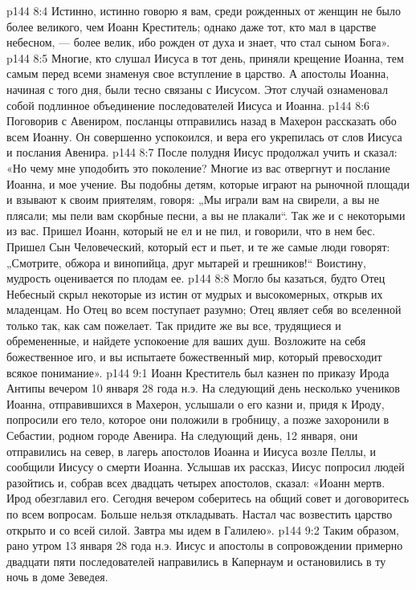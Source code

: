 \vs p144 8:4 Истинно, истинно говорю я вам, среди рожденных от женщин не было более великого, чем Иоанн Креститель; однако даже тот, кто мал в царстве небесном, --- более велик, ибо рожден от духа и знает, что стал сыном Бога».
\vs p144 8:5 Многие, кто слушал Иисуса в тот день, приняли крещение Иоанна, тем самым перед всеми знаменуя свое вступление в царство. А апостолы Иоанна, начиная с того дня, были тесно связаны с Иисусом. Этот случай ознаменовал собой подлинное объединение последователей Иисуса и Иоанна.
\vs p144 8:6 Поговорив с Авениром, посланцы отправились назад в Махерон рассказать обо всем Иоанну. Он совершенно успокоился, и вера его укрепилась от слов Иисуса и послания Авенира.
\vs p144 8:7 После полудня Иисус продолжал учить и сказал: «Но чему мне уподобить это поколение? Многие из вас отвергнут и послание Иоанна, и мое учение. Вы подобны детям, которые играют на рыночной площади и взывают к своим приятелям, говоря: „Мы играли вам на свирели, а вы не плясали; мы пели вам скорбные песни, а вы не плакали“. Так же и с некоторыми из вас. Пришел Иоанн, который не ел и не пил, и говорили, что в нем бес. Пришел Сын Человеческий, который ест и пьет, и те же самые люди говорят: „Смотрите, обжора и винопийца, друг мытарей и грешников!“ Воистину, мудрость оценивается по плодам ее.
\vs p144 8:8 Могло бы казаться, будто Отец Небесный скрыл некоторые из истин от мудрых и высокомерных, открыв их младенцам. Но Отец во всем поступает разумно; Отец являет себя во вселенной только так, как сам пожелает. Так придите же вы все, трудящиеся и обремененные, и найдете успокоение для ваших душ. Возложите на себя божественное иго, и вы испытаете божественный мир, который превосходит всякое понимание».
\vs p144 9:1 Иоанн Креститель был казнен по приказу Ирода Антипы вечером 10 января 28 года н.э. На следующий день несколько учеников Иоанна, отправившихся в Махерон, услышали о его казни и, придя к Ироду, попросили его тело, которое они положили в гробницу, а позже захоронили в Себастии, родном городе Авенира. На следующий день, 12 января, они отправились на север, в лагерь апостолов Иоанна и Иисуса возле Пеллы, и сообщили Иисусу о смерти Иоанна. Услышав их рассказ, Иисус попросил людей разойтись и, собрав всех двадцать четырех апостолов, сказал: «Иоанн мертв. Ирод обезглавил его. Сегодня вечером соберитесь на общий совет и договоритесь по всем вопросам. Больше нельзя откладывать. Настал час возвестить царство открыто и со всей силой. Завтра мы идем в Галилею».
\vs p144 9:2 Таким образом, рано утром 13 января 28 года н.э. Иисус и апостолы в сопровождении примерно двадцати пяти последователей направились в Капернаум и остановились в ту ночь в доме Зеведея.
